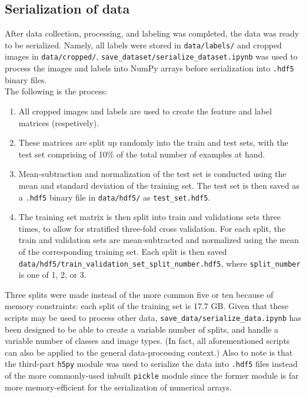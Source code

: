 \documentclass[a4paper, 11pt]{article} %
\begin{document}
	\subsection{Serialization of data}
		After data collection, processing, and labeling was completed, the data was
		ready to be serialized. Namely, all labels were stored in \texttt{data/labels/} and cropped
		images in \texttt{data/cropped/}, \texttt{save\_dataset/serialize\_dataset.ipynb}
		was used to process the images and labels into NumPy arrays before serialization
		into \texttt{.hdf5} binary files.\\
		The following is the process:
		\begin{enumerate}
			\item All cropped images and labels are used to create the feature and label matrices
			(respetively).
			\item These matrices are split up randomly into the train and test sets, with the test
			set comprising of 10\% of the total number of examples at hand.
			\item Mean-subtraction and normalization of the test set is conducted using the mean
			and standard deviation of the training set. The test set is then saved as a
			\texttt{.hdf5} binary file in \texttt{data/hdf5/} as \texttt{test\_set.hdf5}.
			\item The training set matrix is then split into train and validations sets three times,
			to allow for stratified three-fold cross validation. For each split, the train and
			validation sets are mean-subtracted and normalized using the mean of the corresponding
			training set. Each split is then saved
			\texttt{data/hdf5/train\_validation\_set\_{split\_number}.hdf5}, where
			\texttt{split\_number} is one of 1, 2, or 3.
		\end{enumerate}
		Three splits were made instead of the more common five or ten because of memory constraints: each
		split of the training set is 17.7 GB. Given that these scripts may be used to process other data,
		\texttt{save\_data/serialize\_data.ipynb} has been designed to be able to create a variable number
		of splits, and handle a variable number of classes and image types. (In fact, all aforementioned
		scripts can also be applied to the general data-processing context.)
		Also to note is that the third-part \texttt{h5py} module was used to serialize the data into
		\texttt{.hdf5} files instead of the more commonly-used inbuilt \texttt{pickle} module since
		the former module is far more memory-efficient for the serialization of numerical arrays.
	
\end{document}
